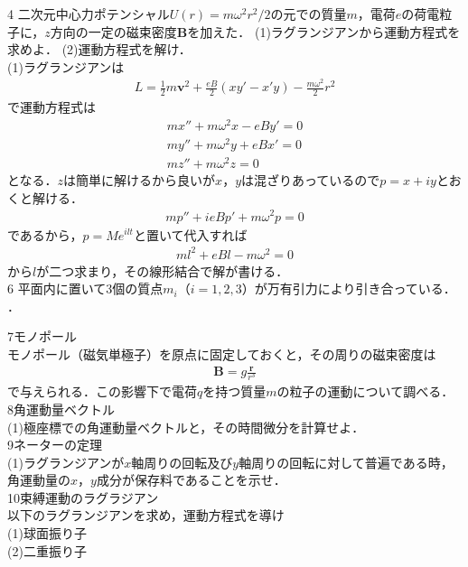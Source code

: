 \documentclass[a4j]{jarticle}
\begin{document}
4
二次元中心力ポテンシャル$U(r)=m\omega^2r^2/2$の元での質量$m$，電荷$e$の荷電粒子に，$z$方向の一定の磁束密度$\bm{B}$を加えた．
(1)ラグランジアンから運動方程式を求めよ．
(2)運動方程式を解け．\\

(1)ラグランジアンは
\begin{align*}
 L=\frac{1}{2}m\bm{v}^2+\frac{eB}{2}(xy'-x'y)-\frac{m\omega^2}{2}r^2
\end{align*}
で運動方程式は
\begin{align*}
 mx''+m\omega^2x-eBy'=0\\
 my''+m\omega^2y+eBx'=0\\
 mz''+m\omega^2z=0
\end{align*}
となる．$z$は簡単に解けるから良いが$x$，$y$は混ざりあっているので$p=x+iy$とおくと解ける．
 \begin{align*}
  mp''+ieBp'+m\omega^2p=0
 \end{align*}
 であるから，$p=Me^{ilt}$と置いて代入すれば
 \begin{align*}
  ml^2+eBl-m\omega^2=0
 \end{align*}
から$l$が二つ求まり，その線形結合で解が書ける．\\

 


6
平面内に置いて$3$個の質点$m_i$（$i=1,2,3$）が万有引力により引き合っている．\\．

7モノポール\\
モノポール（磁気単極子）を原点に固定しておくと，その周りの磁束密度は
\begin{align*}
 \bm{B}=g\frac{\bm{r}}{r^3}
\end{align*}
で与えられる．この影響下で電荷$q$を持つ質量$m$の粒子の運動について調べる．\\

8角運動量ベクトル\\
(1)極座標での角運動量ベクトルと，その時間微分を計算せよ．\\



9ネーターの定理\\
(1)ラグランジアンが$x$軸周りの回転及び$y$軸周りの回転に対して普遍である時，角運動量の$x$，$y$成分が保存料であることを示せ．\\

10束縛運動のラグラジアン\\
以下のラグランジアンを求め，運動方程式を導け\\
(1)球面振り子\\
(2)二重振り子\\
\end{document}
